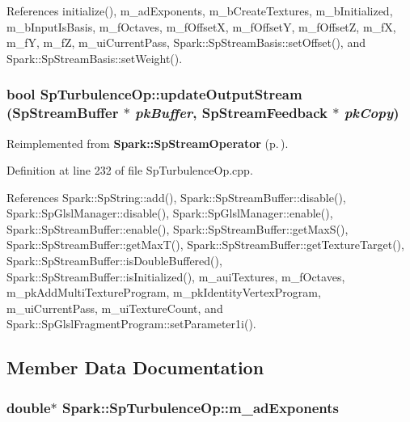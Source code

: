 References initialize(), m\_\-ad\-Exponents, m\_\-b\-Create\-Textures, m\_\-b\-Initialized, m\_\-b\-Input\-Is\-Basis, m\_\-f\-Octaves, m\_\-f\-Offset\-X, m\_\-f\-Offset\-Y, m\_\-f\-Offset\-Z, m\_\-f\-X, m\_\-f\-Y, m\_\-f\-Z, m\_\-ui\-Current\-Pass, Spark::Sp\-Stream\-Basis::set\-Offset(), and Spark::Sp\-Stream\-Basis::set\-Weight().
\subsubsection{\setlength{\rightskip}{0pt plus 5cm}bool Sp\-Turbulence\-Op::update\-Output\-Stream ({\bf Sp\-Stream\-Buffer} $\ast$ {\em pk\-Buffer}, {\bf Sp\-Stream\-Feedback} $\ast$ {\em pk\-Copy})\hspace{0.3cm}{\tt  [protected, virtual]}}\label{classSpark_1_1SpTurbulenceOp_b3}




Reimplemented from {\bf Spark::Sp\-Stream\-Operator} {\rm (p.\,\pageref{classSpark_1_1SpStreamOperator_b4})}.

Definition at line 232 of file Sp\-Turbulence\-Op.cpp.

References Spark::Sp\-String::add(), Spark::Sp\-Stream\-Buffer::disable(), Spark::Sp\-Glsl\-Manager::disable(), Spark::Sp\-Glsl\-Manager::enable(), Spark::Sp\-Stream\-Buffer::enable(), Spark::Sp\-Stream\-Buffer::get\-Max\-S(), Spark::Sp\-Stream\-Buffer::get\-Max\-T(), Spark::Sp\-Stream\-Buffer::get\-Texture\-Target(), Spark::Sp\-Stream\-Buffer::is\-Double\-Buffered(), Spark::Sp\-Stream\-Buffer::is\-Initialized(), m\_\-aui\-Textures, m\_\-f\-Octaves, m\_\-pk\-Add\-Multi\-Texture\-Program, m\_\-pk\-Identity\-Vertex\-Program, m\_\-ui\-Current\-Pass, m\_\-ui\-Texture\-Count, and Spark::Sp\-Glsl\-Fragment\-Program::set\-Parameter1i().

\subsection{Member Data Documentation}
\subsubsection{\setlength{\rightskip}{0pt plus 5cm}double$\ast$ {\bf Spark::Sp\-Turbulence\-Op::m\_\-ad\-Exponents}\hspace{0.3cm}{\tt  [protected]}}\label{classSpark_1_1SpTurbulenceOp_p14}


